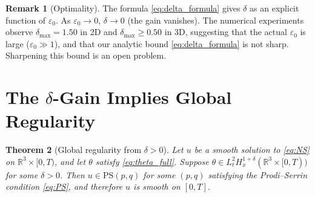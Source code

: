 \documentclass[12pt]{article}
\newtheorem{theorem}{Theorem}[section]
\theoremstyle{definition}
\newtheorem{remark}[theorem]{Remark}
\newcommand{\R}{\mathbb{R}}
\newcommand{\eps}{\varepsilon}
\newcommand{\dgainmax}{\delta_{\max}}
\begin{document}
\begin{remark}[Optimality]
\label{rem:optimality}
The formula \eqref{eq:delta_formula} gives $\delta$ as an explicit function
of $\eps_0$. As $\eps_0 \to 0$, $\delta \to 0$ (the gain vanishes).
The numerical experiments observe $\dgainmax = 1.50$ in 2D and
$\dgainmax \geq 0.50$ in 3D, suggesting that the actual $\eps_0$ is large
($\eps_0 \gg 1$), and that our analytic bound \eqref{eq:delta_formula} is
not sharp. Sharpening this bound is an open problem.
\end{remark}

\section{The $\delta$-Gain Implies Global Regularity}
\label{sec:globalreg}

\begin{theorem}[Global regularity from $\delta > 0$]
\label{thm:globalreg}
Let $u$ be a smooth solution to \eqref{eq:NS} on $\R^3 \times [0,T)$,
and let $\theta$ satisfy \eqref{eq:theta_full}.
Suppose $\theta \in L^2_t H^{1+\delta}_x(\R^3 \times [0,T))$ for some
$\delta > 0$.
Then $u \in \mathrm{PS}(p,q)$ for some $(p,q)$ satisfying the Prodi--Serrin
condition \eqref{eq:PS}, and therefore $u$ is smooth on $[0,T]$.
\end{theorem}
\end{document}
